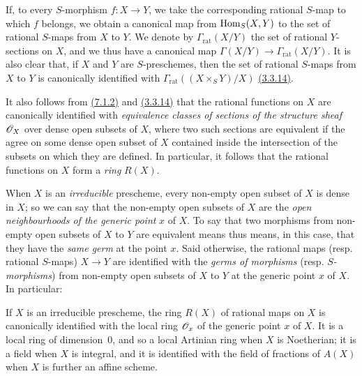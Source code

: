 If, to every $S$-morphism $f\colon X\to Y$, we take the corresponding rational $S$-map to which $f$ belongs, we obtain a canonical map from ${\mathop{\mathrm{Hom}}\nolimits}_S(X,Y)$ to the set of rational $S$-maps from $X$ to $Y$.
We denote by $\Gamma_\mathrm{rat}(X/Y)$ the set of rational $Y$-sections on $X$, and we thus have a canonical map $\Gamma(X/Y)\to\Gamma_\mathrm{rat}(X/Y)$.
It is also clear that, if $X$ and $Y$ are $S$-preschemes, then the set of rational $S$-maps from $X$ to $Y$ is canonically identified with $\Gamma_\mathrm{rat}((X\times_S Y)/X)$ \hyperref[1.3.3.14]{(3.3.14)}.

\begin{env}[7.1.3]
\label{1.7.1.3}
It also follows from \hyperref[1.7.1.2]{(7.1.2)} and \hyperref[1.3.3.14]{(3.3.14)} that the rational functions on $X$ are canonically identified with \emph{equivalence classes of sections of the structure sheaf $\mathscr{O}_X$} over dense open subsets of $X$, where two such sections are equivalent if the agree on some dense open subset of $X$ contained inside the intersection of the subsets on which they are defined.
In particular, it follows that the rational functions on $X$ form a \emph{ring} $R(X)$.
\end{env}

\begin{env}[7.1.4]
\label{1.7.1.4}
When $X$ is an \emph{irreducible} prescheme, every non-empty open subset of $X$ is dense in $X$; so we can say that the non-empty open subsets of $X$ are the \emph{open neighbourhoods of the generic point} $x$ of $X$.
To say that two morphisms from non-empty open subsets of $X$ to $Y$ are equivalent means thus means, in this case, that they have the \emph{same germ} at the point $x$.
Said otherwise, the rational maps (resp. rational $S$-maps) $X\to Y$ are identified with the \emph{germs of morphisms} (resp. \emph{$S$-morphisms}) from non-empty open subsets of $X$ to $Y$ at the generic point $x$ of $X$.
In particular:
\end{env}

\begin{prop}[7.1.5]
\label{1.7.1.5}
If $X$ is an irreducible prescheme, the ring $R(X)$ of rational maps on $X$ is canonically identified with the local ring $\mathscr{O}_x$ of the generic point $x$ of $X$.
It is a local ring of dimension~0, and so a local Artinian ring when $X$ is Noetherian; it is a field when $X$ is integral, and it is identified with the field of fractions of $A(X)$ when $X$ is further an affine scheme.
\end{prop}

